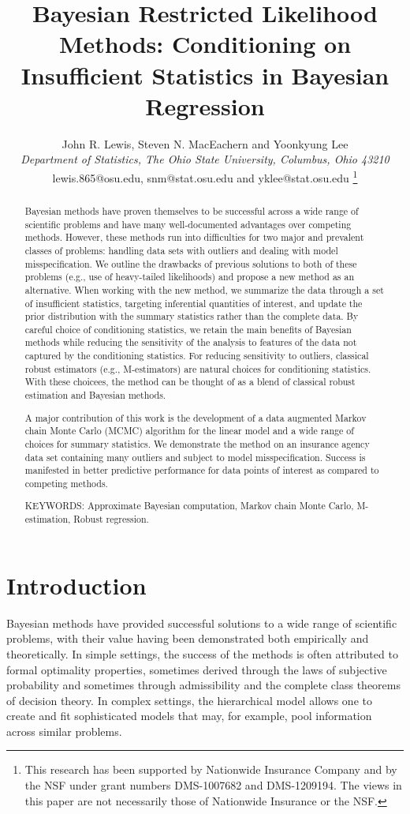 \documentclass[12pt]{article}
\title{Bayesian Restricted Likelihood Methods: Conditioning on Insufficient Statistics in Bayesian Regression}
\author{John R. Lewis, Steven N. MacEachern and  Yoonkyung Lee \\
{\small \it Department of Statistics, The Ohio State University, Columbus, Ohio 43210}\\
{\small lewis.865@osu.edu, snm@stat.osu.edu and yklee@stat.osu.edu}
\thanks{This research has been supported by Nationwide Insurance Company and by the NSF under grant numbers DMS-1007682 and DMS-1209194.  The views in this paper are not necessarily those of Nationwide Insurance or the NSF.}}
\begin{document}
\date{}
\maketitle

\begin{abstract}
Bayesian methods have proven themselves to be successful across a wide
range of scientific problems and have many well-documented advantages
over competing methods. However, these methods run into difficulties
for two major and prevalent classes of problems: handling data sets
with outliers and dealing with model misspecification. We outline the
drawbacks of previous solutions to both of these problems (e.g., use of
heavy-tailed likelihoods) and propose a new method as an
alternative.  When working with the new method, we summarize
the data through a set of insufficient statistics,
targeting inferential quantities of interest, and update the prior
distribution with the summary statistics rather than the complete
data.  By careful choice of conditioning statistics, we
retain the main benefits of Bayesian methods while reducing the
sensitivity of the analysis to features of the data not captured by
the conditioning statistics. For reducing sensitivity to outliers,
classical robust estimators (e.g., M-estimators) are natural choices
for conditioning statistics. With these choicees, the method can be thought of as a
blend of classical robust estimation and Bayesian methods. 

A major contribution of this work is the development of a data 
augmented Markov chain Monte Carlo (MCMC) algorithm
for the linear model and a wide range of choices for
summary statistics. We demonstrate the method on an
insurance agency data set containing many outliers and subject to model
misspecification. Success is manifested in better predictive
performance for data points of interest as compared to competing
methods.

\noindent KEYWORDS: Approximate Bayesian computation, Markov chain
Monte Carlo, M-estimation, Robust regression.


\end{abstract}

\section{Introduction}
Bayesian methods have provided successful solutions to a wide range of scientific problems, with their value
having been demonstrated both empirically and theoretically.  
In simple settings, the success of the methods is often attributed to formal optimality properties, sometimes derived
through the laws of subjective probability 
and sometimes through admissibility and the complete class
theorems of decision theory.  In complex settings, the hierarchical model allows one to create 
and fit sophisticated models that may, for example, pool information across similar problems.  
\end{document}
